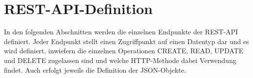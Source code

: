 \chapter{REST-API-Definition}
\label{sec:RESTAPIDefinition}

In den folgenden Abschnitten werden die einzelnen Endpunkte der REST-API definiert.
Jeder Endpunkt stellt einen Zugriffpunkt auf einen Datentyp dar und es wird definiert, inwiefern die einzelnen Operationen CREATE, READ, UPDATE und DELETE zugelassen sind und welche HTTP-Methode dabei Verwendung findet.
Auch erfolgt jeweils die Definition der JSON-Objekte.






